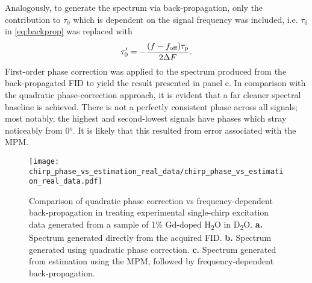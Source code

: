 Analogously, to generate the spectrum via back-propagation, only the
contribution to $\tau_0$ which is dependent on the signal frequency was
included, i.e. $\tau_0$ in \cref{eq:backprop} was replaced with
\begin{equation}
    \tau_{0}^{\prime} = -\frac{(f - f_{\text{off}}) \tau_{\text{p}}}{2 \Delta F}.
\end{equation}
First-order phase correction was applied to the spectrum produced from the
back-propagated \ac{FID} to yield the result presented in panel c.
In comparison with the quadratic phase-correction approach, it is evident that
a far cleaner spectral baseline is achieved. There is not a perfectly
consistent phase across all signals; most notably, the highest and
second-lowest signals have phases which stray noticeably from \ang{0}. It is
likely that this resulted from error associated with the \ac{MPM}.

\begin{figure}
    \centering
    \texttt{[image: chirp\_phase\_vs\_estimation\_real\_data/chirp\_phase\_vs\_estimation\_real\_data.pdf]}
    \caption[
        Comparison of quadratic phase correction vs frequency-dependent
        back-propagation in treating experimental single-chirp excitation data
        generated from a sample of Gd-doped H\textsubscript{2}O in
        D\textsubscript{2}O.
    ]{
        Comparison of quadratic phase correction vs frequency-dependent
        back-propagation in treating experimental single-chirp excitation data
        generated from a sample of 1\% Gd-doped H\textsubscript{2}O in
        D\textsubscript{2}O.
        \textbf{a.} Spectrum generated directly from the acquired \ac{FID}.
        \textbf{b.} Spectrum generated using quadratic phase correction.
        \textbf{c.} Spectrum generated from estimation using the \ac{MPM},
        followed by frequency-dependent back-propagation.
    }
    \label{fig:bbqchili-real}
\end{figure}
